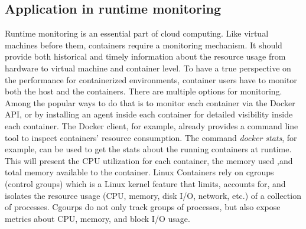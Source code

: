 \subsection{Application in runtime monitoring} 
Runtime monitoring is an essential part of cloud computing\cite{aceto2013cloud}. Like virtual machines before them, containers require a monitoring mechanism. It should provide both historical and timely information about the resource usage from hardware to virtual machine and container level.
To have a true perspective on the performance for containerized environments, container users have to monitor both the host and the containers. There are multiple options for monitoring. 
Among the popular ways to do that is to monitor each container via the Docker API, or by installing an agent inside each container for detailed visibility inside each container. 
The Docker client, for example, already provides a command line tool to inspect containers’ resource consumption. The command \textit{docker stats}, for example, can be used to get the stats about the running containers at runtime. This will present the CPU utilization for each container, the memory used ,and total memory available to the container.
Linux Containers rely on cgroups (control groups) which is a Linux kernel feature that limits, accounts for, and isolates the resource usage (CPU, memory, disk I/O, network, etc.) of a collection of processes.
Cgourps do not only track groups of processes, but also expose metrics about CPU, memory, and block I/O usage. 

